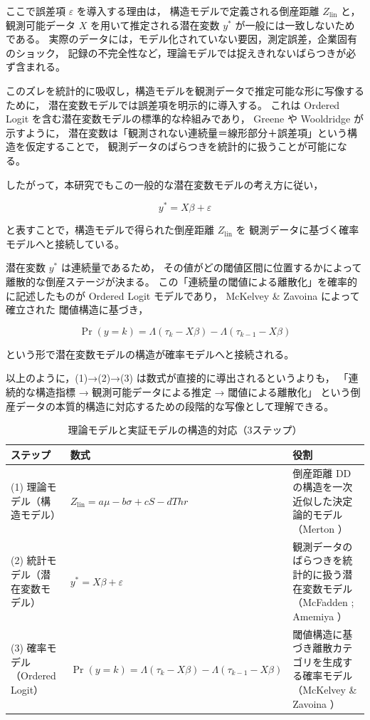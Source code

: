 ここで誤差項 $\varepsilon$ を導入する理由は，
構造モデルで定義される倒産距離 $Z_{\text{lin}}$ と，
観測可能データ $X$ を用いて推定される潜在変数 $y^*$ が一般には一致しないためである。
実際のデータには，モデル化されていない要因，測定誤差，企業固有のショック，
記録の不完全性など，理論モデルでは捉えきれないばらつきが必ず含まれる。

このズレを統計的に吸収し，構造モデルを観測データで推定可能な形に写像するために，
潜在変数モデルでは誤差項を明示的に導入する。
これは Ordered Logit を含む潜在変数モデルの標準的な枠組みであり，
Greene \parencite{Greene2018} や Wooldridge \parencite{Wooldridge2010} が示すように，
潜在変数は「観測されない連続量＝線形部分＋誤差項」という構造を仮定することで，
観測データのばらつきを統計的に扱うことが可能になる。

したがって，本研究でもこの一般的な潜在変数モデルの考え方に従い，



\[
y^* = X\beta + \varepsilon
\]



と表すことで，構造モデルで得られた倒産距離 $Z_{\text{lin}}$ を
観測データに基づく確率モデルへと接続している。

潜在変数 $y^*$ は連続量であるため，
その値がどの閾値区間に位置するかによって離散的な倒産ステージが決まる。
この「連続量の閾値による離散化」を確率的に記述したものが Ordered Logit モデルであり，
McKelvey \& Zavoina \parencite{McKelveyZavoina1975} によって確立された
閾値構造に基づき，



\[
\Pr(y=k)
= \Lambda(\tau_k - X\beta) - \Lambda(\tau_{k-1} - X\beta)
\]



という形で潜在変数モデルの構造が確率モデルへと接続される。

以上のように，(1)→(2)→(3) は数式が直接的に導出されるというよりも，
「連続的な構造指標 → 観測可能データによる推定 → 閾値による離散化」
という倒産データの本質的構造に対応するための段階的な写像として理解できる。

\begin{table}[H]
\centering
\caption{理論モデルと実証モデルの構造的対応（3ステップ）}
\label{tab:theory_empirical_mapping}
\begin{tabular}{p{3cm} p{6cm} p{6cm}}
\toprule
ステップ & 数式 & 役割 \\
\midrule
(1) 理論モデル（構造モデル） &
\(\displaystyle Z_{\text{lin}} = a\mu - b\sigma + cS - dThr\) &
倒産距離 DD の構造を一次近似した決定論的モデル（Merton \parencite{Merton1974}） \\

(2) 統計モデル（潜在変数モデル） &
\(\displaystyle y^* = X\beta + \varepsilon\) &
観測データのばらつきを統計的に扱う潜在変数モデル（McFadden \parencite{McFadden1974}; Amemiya \parencite{Amemiya1981}） \\

(3) 確率モデル（Ordered Logit） &
\(\displaystyle \Pr(y=k)=\Lambda(\tau_k - X\beta)-\Lambda(\tau_{k-1}-X\beta)\) &
閾値構造に基づき離散カテゴリを生成する確率モデル（McKelvey \& Zavoina \parencite{McKelveyZavoina1975}） \\
\bottomrule
\end{tabular}
\end{table}

